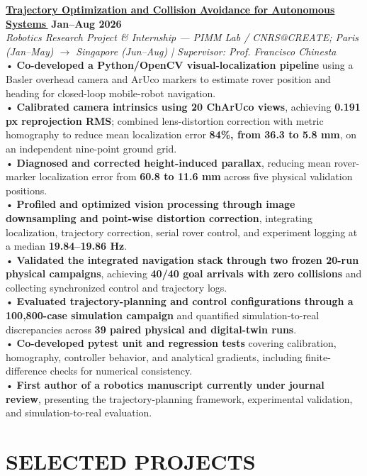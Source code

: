 \documentclass[10pt]{article}
\newcommand{\linkicon}{\,{\textcolor{linkblue}{\scriptsize\faExternalLink*}}}
\begin{document}
\textbf{\href{https://slimaneaouanouk.com/paco-showcase/index.html}{Trajectory Optimization and Collision Avoidance for Autonomous Systems\linkicon}} \hfill \textbf{Jan--Aug 2026}\\
\textit{Robotics Research Project \& Internship — PIMM Lab / CNRS@CREATE; Paris (Jan--May) $\rightarrow$ Singapore (Jun--Aug) \; | \; Supervisor: Prof. Francisco Chinesta}\\
• \textbf{Co-developed a Python/OpenCV visual-localization pipeline} using a Basler overhead camera and ArUco markers to estimate rover position and heading for closed-loop mobile-robot navigation.\\
• \textbf{Calibrated camera intrinsics using 20 ChArUco views}, achieving \textbf{0.191 px reprojection RMS}; combined lens-distortion correction with metric homography to reduce mean localization error \textbf{84\%, from 36.3 to 5.8 mm}, on an independent nine-point ground grid.\\
• \textbf{Diagnosed and corrected height-induced parallax}, reducing mean rover-marker localization error from \textbf{60.8 to 11.6 mm} across five physical validation positions.\\
• \textbf{Profiled and optimized vision processing through image downsampling and point-wise distortion correction}, integrating localization, trajectory correction, serial rover control, and experiment logging at a median \textbf{19.84--19.86 Hz}.\\
• \textbf{Validated the integrated navigation stack through two frozen 20-run physical campaigns}, achieving \textbf{40/40 goal arrivals with zero collisions} and collecting synchronized control and trajectory logs.\\
• \textbf{Evaluated trajectory-planning and control configurations through a 100,800-case simulation campaign} and quantified simulation-to-real discrepancies across \textbf{39 paired physical and digital-twin runs}.\\
• \textbf{Co-developed pytest unit and regression tests} covering calibration, homography, controller behavior, and analytical gradients, including finite-difference checks for numerical consistency.\\
• \textbf{First author of a robotics manuscript currently under journal review}, presenting the trajectory-planning framework, experimental validation, and simulation-to-real evaluation.

\medskip

\section*{SELECTED PROJECTS}
\end{document}
